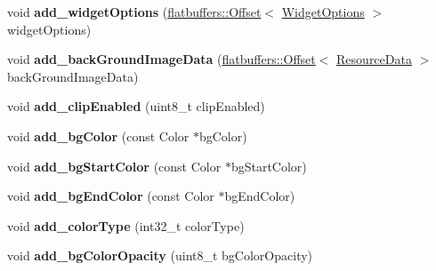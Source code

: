 \begin{DoxyCompactItemize}
\mbox{\label{structflatbuffers_1_1ListViewOptionsBuilder_a5b2d4ba5a912bd785acd698a9ec14302}} 
void {\bfseries add\+\_\+widget\+Options} (\hyperlink{structflatbuffers_1_1Offset}{flatbuffers\+::\+Offset}$<$ \hyperlink{structflatbuffers_1_1WidgetOptions}{Widget\+Options} $>$ widget\+Options)
\item 
\mbox{\label{structflatbuffers_1_1ListViewOptionsBuilder_af879ee535bfcd1e08baca80a9bc1bc8a}} 
void {\bfseries add\+\_\+back\+Ground\+Image\+Data} (\hyperlink{structflatbuffers_1_1Offset}{flatbuffers\+::\+Offset}$<$ \hyperlink{structflatbuffers_1_1ResourceData}{Resource\+Data} $>$ back\+Ground\+Image\+Data)
\item 
\mbox{\label{structflatbuffers_1_1ListViewOptionsBuilder_ae320e2443f26192b660d9432aa975229}} 
void {\bfseries add\+\_\+clip\+Enabled} (uint8\+\_\+t clip\+Enabled)
\item 
\mbox{\label{structflatbuffers_1_1ListViewOptionsBuilder_ae579c4a2d53c9183c479b572657593b8}} 
void {\bfseries add\+\_\+bg\+Color} (const Color $\ast$bg\+Color)
\item 
\mbox{\label{structflatbuffers_1_1ListViewOptionsBuilder_a06aaa63e74f6187eb9d286de50d23615}} 
void {\bfseries add\+\_\+bg\+Start\+Color} (const Color $\ast$bg\+Start\+Color)
\item 
\mbox{\label{structflatbuffers_1_1ListViewOptionsBuilder_aaaf9b4c6c4c88bdd4ac7d11b2fa327a5}} 
void {\bfseries add\+\_\+bg\+End\+Color} (const Color $\ast$bg\+End\+Color)
\item 
\mbox{\label{structflatbuffers_1_1ListViewOptionsBuilder_abe534e59438ae80556f296af46512ce4}} 
void {\bfseries add\+\_\+color\+Type} (int32\+\_\+t color\+Type)
\item 
\mbox{\label{structflatbuffers_1_1ListViewOptionsBuilder_ac6385314cf622a941329888c6f5fb1e7}} 
void {\bfseries add\+\_\+bg\+Color\+Opacity} (uint8\+\_\+t bg\+Color\+Opacity)

\end{DoxyCompactItemize}
